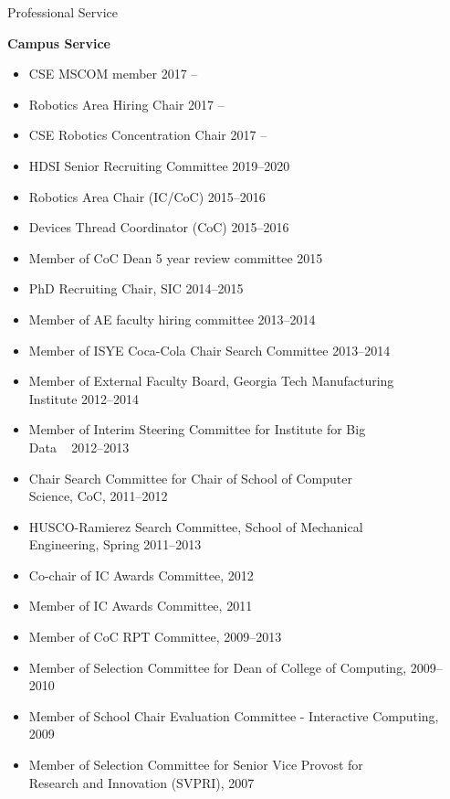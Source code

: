 \documentclass{article}
\begin{document}
\begin{cv}
\begin{cvlist}{Professional Service}
\item {\bf Campus Service}
  \begin{itemize}
  \item CSE MSCOM member \cftdotfill{\cftdotsep} 2017 --
  \item Robotics Area Hiring Chair \cftdotfill{\cftdotsep} 2017 --
  \item CSE Robotics Concentration Chair \cftdotfill{\cftdotsep}
    2017 --
  \item HDSI Senior Recruiting Committee  \cftdotfill{\cftdotsep} 2019--2020
  \item Robotics Area Chair (IC/CoC) \cftdotfill{\cftdotsep} 2015--2016
  \item Devices Thread Coordinator (CoC) \cftdotfill{\cftdotsep} 2015--2016
  \item Member of CoC Dean 5 year review committee
    \cftdotfill{\cftdotsep} 2015
  \item PhD Recruiting Chair, SIC \cftdotfill{\cftdotsep} 2014--2015
  \item Member of AE faculty hiring committee \cftdotfill{\cftdotsep}
    2013--2014
  \item Member of ISYE Coca-Cola Chair Search Committee
    \cftdotfill{\cftdotsep} 2013--2014
  \item Member of External Faculty Board, Georgia Tech Manufacturing\\
    Institute \cftdotfill{\cftdotsep} 2012--2014
  \item Member of Interim Steering Committee for Institute for Big
    \\Data ~ \cftdotfill{\cftdotsep} 2012--2013
  \item Chair Search Committee for Chair of School of Computer\\
    Science, CoC, \cftdotfill{\cftdotsep} 2011--2012
  \item HUSCO-Ramierez Search Committee, School of Mechanical\\
    Engineering, Spring \cftdotfill{\cftdotsep} 2011--2013
  \item Co-chair of IC Awards Committee, \cftdotfill{\cftdotsep} 2012
  \item Member of IC Awards Committee, \cftdotfill{\cftdotsep} 2011
  \item Member of CoC RPT Committee, \cftdotfill{\cftdotsep} 2009--2013
  \item Member of Selection Committee for Dean of College of
    Computing, \cftdotfill{\cftdotsep} 2009--2010
  \item Member of School Chair Evaluation Committee - Interactive
    Computing, \cftdotfill{\cftdotsep} 2009
  \item Member of Selection Committee for Senior Vice Provost for \\
    Research and Innovation (SVPRI), \cftdotfill{\cftdotsep} 2007
  \end{itemize}


\end{cvlist}
\end{cv}
\end{document}
